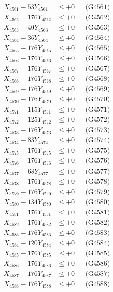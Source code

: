 \documentclass[a4paper,10pt]{article}
\begin{document}
{\begin{align}
\allowbreak
X_{4561} - 53Y_{4561} &\leq +0 && \text{(G4561)} \\
X_{4562} - 176Y_{4562} &\leq +0 && \text{(G4562)} \\
X_{4563} - 40Y_{4563} &\leq +0 && \text{(G4563)} \\
X_{4564} - 36Y_{4564} &\leq +0 && \text{(G4564)} \\
X_{4565} - 176Y_{4565} &\leq +0 && \text{(G4565)} \\
X_{4566} - 176Y_{4566} &\leq +0 && \text{(G4566)} \\
X_{4567} - 176Y_{4567} &\leq +0 && \text{(G4567)} \\
X_{4568} - 176Y_{4568} &\leq +0 && \text{(G4568)} \\
X_{4569} - 176Y_{4569} &\leq +0 && \text{(G4569)} \\
X_{4570} - 176Y_{4570} &\leq +0 && \text{(G4570)} \\
\allowbreak
X_{4571} - 115Y_{4571} &\leq +0 && \text{(G4571)} \\
X_{4572} - 125Y_{4572} &\leq +0 && \text{(G4572)} \\
X_{4573} - 176Y_{4573} &\leq +0 && \text{(G4573)} \\
X_{4574} - 83Y_{4574} &\leq +0 && \text{(G4574)} \\
X_{4575} - 176Y_{4575} &\leq +0 && \text{(G4575)} \\
X_{4576} - 176Y_{4576} &\leq +0 && \text{(G4576)} \\
X_{4577} - 68Y_{4577} &\leq +0 && \text{(G4577)} \\
X_{4578} - 176Y_{4578} &\leq +0 && \text{(G4578)} \\
X_{4579} - 176Y_{4579} &\leq +0 && \text{(G4579)} \\
X_{4580} - 134Y_{4580} &\leq +0 && \text{(G4580)} \\
\allowbreak
X_{4581} - 176Y_{4581} &\leq +0 && \text{(G4581)} \\
X_{4582} - 176Y_{4582} &\leq +0 && \text{(G4582)} \\
X_{4583} - 176Y_{4583} &\leq +0 && \text{(G4583)} \\
X_{4584} - 120Y_{4584} &\leq +0 && \text{(G4584)} \\
X_{4585} - 176Y_{4585} &\leq +0 && \text{(G4585)} \\
X_{4586} - 176Y_{4586} &\leq +0 && \text{(G4586)} \\
X_{4587} - 176Y_{4587} &\leq +0 && \text{(G4587)} \\
X_{4588} - 176Y_{4588} &\leq +0 && \text{(G4588)} \\

\end{align}}
\end{document}
